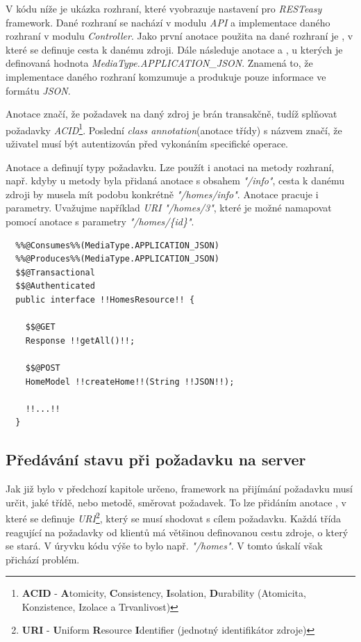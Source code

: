 V kódu níže je ukázka rozhraní, které vyobrazuje nastavení pro \emph{RESTeasy} framework.
Dané rozhraní se nachází v modulu \emph{API} a implementace daného rozhraní v modulu \emph{Controller}.
Jako první anotace použita na dané rozhraní je , v které se definuje cesta k danému zdroji.
Dále následuje anotace  a , u kterých je definovaná hodnota \emph{MediaType.APPLICATION\_JSON}.
Znamená to, že implementace daného rozhraní komzumuje a produkuje pouze informace ve formátu \emph{JSON}.

Anotace  značí, že požadavek na daný zdroj je brán transakčně, tudíž splňovat požadavky \emph{ACID}\footnote{\textbf{ACID} - \textbf{A}tomicity, \textbf{C}onsistency, \textbf{I}solation, \textbf{D}urability (Atomicita, Konzistence, Izolace a Trvanlivost)}.
Poslední \emph{class annotation}(anotace třídy) s názvem  značí, že uživatel musí být autentizován před vykonáním specifické operace.

Anotace  a  definují typy požadavku.
Lze použít i anotaci  na metody rozhraní, např. kdyby u metody byla přidaná anotace  s obsahem \emph{"/info"}, cesta k danému zdroji
by musela mít podobu konkrétně \emph{"/homes/info"}.
Anotace  pracuje i parametry.
Uvažujme například \emph{URI} \emph{"/homes/3"}, které je možné namapovat pomocí anotace  s parametry \emph{"/homes/\{id\}"}.

\begin{lstlisting}[caption={Ukázka deklarování rozhraní pro správu domácností}]
  %%@Path%%("/homes")
  %%@Consumes%%(MediaType.APPLICATION_JSON)
  %%@Produces%%(MediaType.APPLICATION_JSON)
  $$@Transactional
  $$@Authenticated
  public interface !!HomesResource!! {

    $$@GET
    Response !!getAll()!!;

    $$@POST
    HomeModel !!createHome!!(String !!JSON!!);

    !!...!!
  }
\end{lstlisting}

\subsection*{Předávání stavu při požadavku na server}
\label{impl:backend:state}

Jak již bylo v předchozí kapitole určeno, framework na přijímání požadavku musí určit, jaké třídě, nebo metodě, směrovat požadavek.
To lze přidáním anotace , v které se definuje \emph{URI}\footnote{\textbf{URI} - \textbf{U}niform \textbf{R}esource \textbf{I}dentifier (jednotný identifikátor zdroje)}, který se musí shodovat s cílem požadavku.
Každá třída reagující na požadavky od klientů má většinou definovanou cestu zdroje, o který se stará.
V úryvku kódu výše to bylo např. \emph{"/homes"}.
V tomto úskalí však přichází problém.

